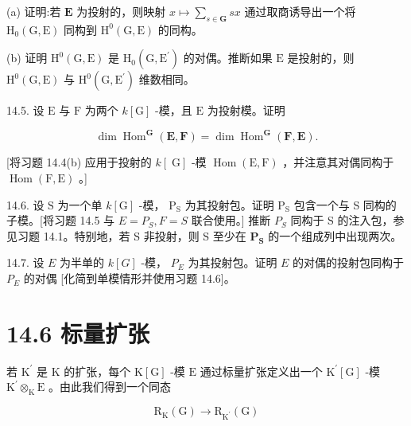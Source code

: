 \documentclass[10pt]{article}
\begin{document}
(a) 证明:若 \(\mathbf{E}\) 为投射的，则映射 \(x \mapsto  \mathop{\sum }\limits_{{s \in  \mathbf{G}}}{sx}\) 通过取商诱导出一个将 \({\mathrm{H}}_{0}\left( {\mathrm{G},\mathrm{E}}\right)\) 同构到 \({\mathrm{H}}^{0}\left( {\mathrm{G},\mathrm{E}}\right)\) 的同构。

(b) 证明 \({\mathrm{H}}^{0}\left( {\mathrm{G},\mathrm{E}}\right)\) 是 \({\mathrm{H}}_{0}\left( {\mathrm{G},{\mathrm{E}}^{\prime }}\right)\) 的对偶。推断如果 \(\mathrm{E}\) 是投射的，则 \({\mathrm{H}}^{0}\left( {\mathrm{G},\mathrm{E}}\right)\) 与 \({\mathrm{H}}^{0}\left( {\mathrm{G},{\mathrm{E}}^{\prime }}\right)\) 维数相同。

14.5. 设 \(\mathrm{E}\) 与 \(\mathrm{F}\) 为两个 \(k\left\lbrack  \mathrm{G}\right\rbrack\) -模，且 \(\mathrm{E}\) 为投射模。证明

\[
\dim {\operatorname{Hom}}^{\mathbf{G}}\left( {\mathbf{E},\mathbf{F}}\right)  = \dim {\operatorname{Hom}}^{\mathbf{G}}\left( {\mathbf{F},\mathbf{E}}\right) .
\]

[将习题 14.4(b) 应用于投射的 \(k\left\lbrack  \mathrm{\;G}\right\rbrack\) -模 \(\operatorname{Hom}\left( {\mathrm{E},\mathrm{F}}\right)\) ，并注意其对偶同构于 \(\operatorname{Hom}\left( {\mathrm{F},\mathrm{E}}\right)\) 。]

14.6. 设 \(\mathrm{S}\) 为一个单 \(k\left\lbrack  \mathrm{G}\right\rbrack\) -模， \({\mathrm{P}}_{\mathrm{S}}\) 为其投射包。证明 \({\mathrm{P}}_{\mathrm{S}}\) 包含一个与 S 同构的子模。[将习题 14.5 与 \(E = {P}_{S},F = S\) 联合使用。] 推断 \({P}_{S}\) 同构于 S 的注入包，参见习题 14.1。特别地，若 S 非投射，则 S 至少在 \({\mathbf{P}}_{\mathbf{S}}\) 的一个组成列中出现两次。

14.7. 设 \(E\) 为半单的 \(k\left\lbrack  G\right\rbrack\) -模， \({P}_{E}\) 为其投射包。证明 \(E\) 的对偶的投射包同构于 \({P}_{E}\) 的对偶 [化简到单模情形并使用习题 14.6]。

\section*{14.6 标量扩张}

若 \({\mathrm{K}}^{\prime }\) 是 \(\mathrm{K}\) 的扩张，每个 \(\mathrm{K}\left\lbrack  \mathrm{G}\right\rbrack\) -模 \(\mathrm{E}\) 通过标量扩张定义出一个 \({\mathrm{K}}^{\prime }\left\lbrack  \mathrm{G}\right\rbrack\) -模 \({\mathrm{K}}^{\prime }{ \otimes  }_{\mathrm{K}}\mathrm{E}\) 。由此我们得到一个同态

\[
{\mathrm{R}}_{\mathrm{K}}\left( \mathrm{G}\right)  \rightarrow  {\mathrm{R}}_{{\mathrm{K}}^{\prime }}\left( \mathrm{G}\right)
\]
\end{document}
